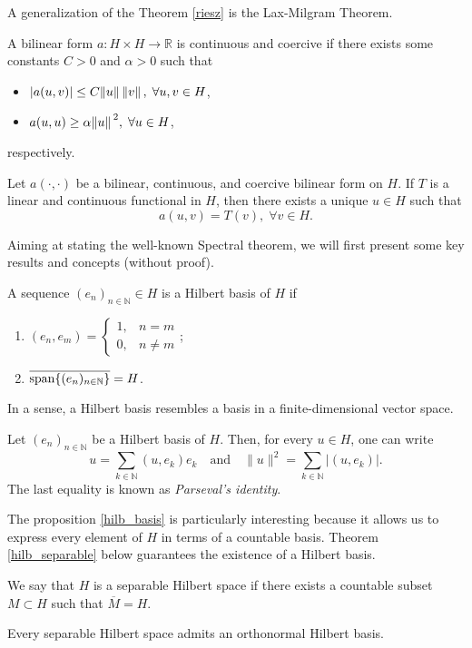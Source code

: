 A generalization of the Theorem \ref{riesz} is the Lax-Milgram Theorem.

\begin{definition}
   A bilinear form \(a: H \times H \rightarrow \mathbb{R}\) is continuous and coercive if there exists some constants \(C >0\) and \(\alpha >0\) such that
    \begin{itemize}
        \item \(\abs{a(u,v)} \leq C \norm*{u}\norm*{v}, \; \forall u, v \in H\),
        \item \(a(u,u) \geq \alpha \norm*{u}^2, \; \forall u \in H\),
    \end{itemize}
    respectively.
\end{definition}
\begin{theorem}\label{lax-milgram}
    Let \(a(\cdot,\cdot)\) be a bilinear, continuous, and coercive bilinear form on \(H\). If \(T\) is a linear and continuous functional in \(H\), then there exists a unique \(u \in H\) such that
    \[
        a(u, v) = T(v), \; \forall v \in H.
    \]
\end{theorem}

Aiming at stating the well-known Spectral theorem, we will first present some key results and concepts (without proof).

\begin{definition}
    A sequence \((e_n)_{n \in \mathbb{N}} \in H\) is a Hilbert basis of \(H\) if
    \begin{enumerate}
        \item \((e_n, e_m) = \begin{cases}
            1, & n=m\\
            0, & n \neq m
        \end{cases}\);
        \item \(\overline{\operatorname{span}\{(e_n)_{n \in \mathbb{N}}\}} = H\).
    \end{enumerate}
\end{definition}
In a sense, a Hilbert basis resembles a basis in a finite-dimensional vector space.
\begin{proposition}\label{hilb_basis}
    Let $(e_n)_{n \in \mathbb{N}}$ be a Hilbert basis of $H$. Then, for every $u \in H$, one can write
    \[
        u = \sum_{k \in \mathbb{N}} (u, e_k)e_k \quad \text{and} \quad \|u\|^2 = \sum_{k \in \mathbb{N}} |(u, e_k)|.
    \]
    The last equality is known as \textit{Parseval's identity}.
\end{proposition}
The proposition \ref{hilb_basis} is particularly interesting because it allows us to express every element of \(H\) in terms of a countable basis. Theorem \ref{hilb_separable} below guarantees the existence of a Hilbert basis.
\begin{definition}
    We say that \(H\) is a separable Hilbert space if there exists a countable subset \(M \subset H\) such that \(\overline{M} = H\).
\end{definition}
\begin{theorem}\label{hilb_separable}
    Every separable Hilbert space admits an orthonormal Hilbert basis.
\end{theorem}

